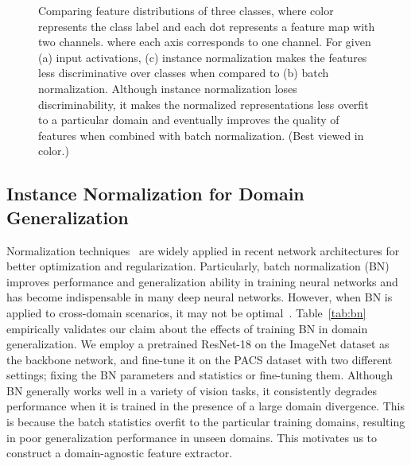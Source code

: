 \documentclass[runningheads]{llncs}
\begin{document}
\begin{figure*}
\begin{center}
	\caption{Comparing feature distributions of three classes, where color represents the class label and each dot represents a feature map with two channels. where each axis corresponds to one channel. For given (a) input activations, (c) instance normalization makes the features less discriminative over classes when compared to (b) batch normalization. Although instance normalization loses discriminability, it makes the normalized representations less overfit to a particular domain and eventually improves the quality of features when combined with batch normalization. (Best viewed in color.)}
	\label{fig:normailization}
\end{center}
\end{figure*}

\subsection{Instance Normalization for Domain Generalization}
\label{sub:batch}

Normalization techniques~\cite{bn,in,ln,gn} are widely applied in recent network architectures for better optimization and regularization.
Particularly, batch normalization (BN)~\cite{bn} improves performance and generalization ability in training neural networks and has become indispensable in many deep neural networks.
However, when BN is applied to cross-domain scenarios, it may not be optimal~\cite{bilen2017universal}.
Table~\ref{tab:bn} empirically validates our claim about the effects of training BN in domain generalization.
We employ a pretrained ResNet-18 on the ImageNet dataset as the backbone network, and fine-tune it on the PACS dataset with two different settings; fixing the BN parameters and statistics or fine-tuning them.
Although BN generally works well in a variety of vision tasks, it consistently degrades performance when it is trained in the presence of a large domain divergence.
This is because the batch statistics overfit to the particular training domains, resulting in poor generalization performance in unseen domains.
This motivates us to construct a domain-agnostic feature extractor. 
\end{document}
